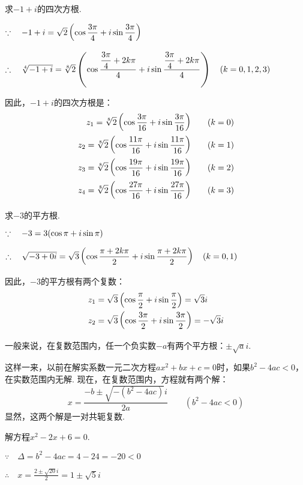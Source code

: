 \begin{example}
    求$-1+i$的四次方根.
\end{example}

\begin{solution}
$\because\quad -1+i=\sqrt{2}\left(\cos{\dfrac{3\pi}{4}}+i\sin{\dfrac{3\pi}{4}}\right)$

$\therefore\quad \sqrt[4]{-1+i}=\sqrt[8]{2}\left(\cos{\dfrac{\dfrac{3\pi}{4}+2k\pi}{4}}+i\sin{\dfrac{\dfrac{3\pi}{4}+2k\pi}{4}}\right)\quad (k=0,1,2,3)$

因此，$-1+i$的四次方根是：
\[\begin{split}
z_1=\sqrt[8]{2}\left(\cos{\dfrac{3\pi}{16}}+i\sin{\dfrac{3\pi}{16}}\right)\qquad & (k=0)\\
z_2=\sqrt[8]{2}\left(\cos{\dfrac{11\pi}{16}}+i\sin{\dfrac{11\pi}{16}}\right)\qquad & (k=1)\\
z_3=\sqrt[8]{2}\left(\cos{\dfrac{19\pi}{16}}+i\sin{\dfrac{19\pi}{16}}\right)\qquad & (k=2)\\
z_4=\sqrt[8]{2}\left(\cos{\dfrac{27\pi}{16}}+i\sin{\dfrac{27\pi}{16}}\right)\qquad & (k=3)\\
\end{split}\]
\end{solution}

\begin{example}
    求$-3$的平方根.
\end{example}

\begin{solution}
$\because\quad -3=3(\cos{\pi}+i\sin{\pi})$

$\therefore\quad \sqrt{-3+0i}=\sqrt{3}\left(\cos{\dfrac{\pi+2k\pi}{2}}+i\sin{\dfrac{\pi+2k\pi}{2}}\right)\quad (k=0,1)$

因此，$-3$的平方根有两个复数：
\[\begin{split}
z_1&=\sqrt{3}\left(\cos{\dfrac{\pi}{2}}+i\sin{\dfrac{\pi}{2}}\right)=\sqrt{3}i\\
z_2&=\sqrt{3}\left(\cos{\dfrac{3\pi}{2}}+i\sin{\dfrac{3\pi}{2}}\right)=-\sqrt{3}i\\
\end{split}\]
\end{solution}

一般来说，在复数范围内，任一个负实数$-a$有两个平方根：$\pm\sqrt{a}i$.

这样一来，以前在解实系数一元二次方程$ax^2+bx+c=0$时，如果$b^2-4ac<0$，在实数范围内无解. 现在，在复数范围内，方程就有两个解：
\[x=\frac{-b\pm\sqrt{-(b^2-4ac)}i}{2a}\qquad (b^2-4ac<0)\]
显然，这两个解是一对共轭复数.

\begin{example}
    解方程$x^2-2x+6=0$.
\end{example}

\begin{solution}
$\because\quad \Delta=b^2-4ac=4-24=-20<0$

$\therefore\quad x=\frac{2\pm\sqrt{20}i}{2}=1\pm\sqrt{5}i$
\end{solution}

